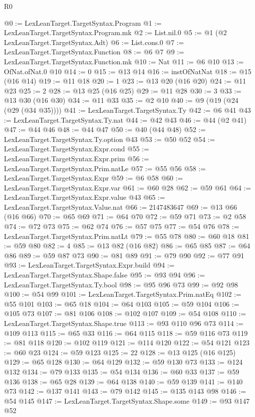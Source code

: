 \begin{lexlean}{R0}
\begin{coremodule}
@0 := LexLeanTarget.TargetSyntax.Program
@1 := LexLeanTarget.TargetSyntax.Program.mk
@2 := List.nil.{0}
@5 := @1 (@2 LexLeanTarget.TargetSyntax.Adt)
@6 := List.cons.{0}
@7 := LexLeanTarget.TargetSyntax.Function
@8 := @6 @7
@9 := LexLeanTarget.TargetSyntax.Function.mk
@10 := Nat
@11 := @6 @10
@13 := OfNat.ofNat.{0} @10
@14 := 0
@15 := @13 @14
@16 := instOfNatNat
@18 := @15 (@16 @14)
@19 := @11 @18
@20 := 1
@23 := @13 @20 (@16 @20)
@24 := @11 @23
@25 := 2
@28 := @13 @25 (@16 @25)
@29 := @11 @28
@30 := 3
@33 := @13 @30 (@16 @30)
@34 := @11 @33
@35 := @2 @10
@40 := @9 (@19 (@24 (@29 (@34 @35))))
@41 := LexLeanTarget.TargetSyntax.Ty
@42 := @6 @41
@43 := LexLeanTarget.TargetSyntax.Ty.nat
@44 := @42 @43
@46 := @44 (@2 @41)
@47 := @44 @46
@48 := @44 @47
@50 := @40 (@44 @48)
@52 := LexLeanTarget.TargetSyntax.Ty.option @43
@53 := @50 @52
@54 := LexLeanTarget.TargetSyntax.Expr.cond
@55 := LexLeanTarget.TargetSyntax.Expr.prim
@56 := LexLeanTarget.TargetSyntax.Prim.natLe
@57 := @55 @56
@58 := LexLeanTarget.TargetSyntax.Expr
@59 := @6 @58
@60 := LexLeanTarget.TargetSyntax.Expr.var
@61 := @60 @28
@62 := @59 @61
@64 := LexLeanTarget.TargetSyntax.Expr.value @43
@65 := LexLeanTarget.TargetSyntax.Value.nat
@66 := 2147483647
@69 := @13 @66 (@16 @66)
@70 := @65 @69
@71 := @64 @70
@72 := @59 @71
@73 := @2 @58
@74 := @72 @73
@75 := @62 @74
@76 := @57 @75
@77 := @54 @76
@78 := LexLeanTarget.TargetSyntax.Prim.natLt
@79 := @55 @78
@80 := @60 @18
@81 := @59 @80
@82 := 4
@85 := @13 @82 (@16 @82)
@86 := @65 @85
@87 := @64 @86
@89 := @59 @87 @73
@90 := @81 @89
@91 := @79 @90
@92 := @77 @91
@93 := LexLeanTarget.TargetSyntax.Expr.build
@94 := LexLeanTarget.TargetSyntax.Shape.false
@95 := @93 @94
@96 := LexLeanTarget.TargetSyntax.Ty.bool
@98 := @95 @96 @73
@99 := @92 @98
@100 := @54 @99
@101 := LexLeanTarget.TargetSyntax.Prim.natEq
@102 := @55 @101
@103 := @65 @18
@104 := @64 @103
@105 := @59 @104
@106 := @105 @73
@107 := @81 @106
@108 := @102 @107
@109 := @54 @108
@110 := LexLeanTarget.TargetSyntax.Shape.true
@113 := @93 @110 @96 @73
@114 := @109 @113
@115 := @65 @33
@116 := @64 @115
@118 := @59 @116 @73
@119 := @81 @118
@120 := @102 @119
@121 := @114 @120
@122 := @54 @121
@123 := @60 @23
@124 := @59 @123
@125 := 22
@128 := @13 @125 (@16 @125)
@129 := @65 @128
@130 := @64 @129
@132 := @59 @130 @73
@133 := @124 @132
@134 := @79 @133
@135 := @54 @134
@136 := @60 @33
@137 := @59 @136
@138 := @65 @28
@139 := @64 @138
@140 := @59 @139
@141 := @140 @73
@142 := @137 @141
@143 := @79 @142
@145 := @135 @143 @98
@146 := @54 @145
@147 := LexLeanTarget.TargetSyntax.Shape.some
@149 := @93 @147 @52

\end{coremodule}
\end{lexlean}
